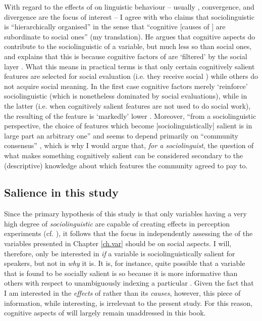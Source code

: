 With regard to the effects of  on linguistic behaviour -- usually , convergence, and divergence are the focus of interest -- I agree with \textcite[17]{auer2014} who claims that sociolinguistic  is ``hierarchically organised'' in the sense that ``cognitive [causes of ] are subordinate to social ones'' (my translation).
He argues that cognitive aspects do contribute to the sociolinguistic  of a variable, but much less so than social ones, and explains that this is because cognitive factors of  are `filtered' by the social layer \parencite[cf.][18]{auer2014}.
What this means in practical terms is that only certain cognitively salient features are selected for social evaluation (i.e. they receive social ) while others do not acquire social meaning.
In the first case cognitive factors merely `reinforce' sociolinguistic  (which is nonetheless dominated by social evaluations), while in the latter (i.e. when cognitively salient features are not used to do social work), the resulting  of the feature is `markedly' lower \parencite[cf.][18]{auer2014}.
Moreover, \enquote{from a sociolinguistic perspective, the choice of features which become [sociolinguistically] salient is in large part an arbitrary one} and seems to depend primarily on \enquote{community consensus} \parencite[56]{llamasetal2017}, which is why I would argue that, \emph{for a sociolinguist}, the question of what makes something cognitively salient can be considered secondary to the (descriptive) knowledge about which features the community agreed to pay  to.

		\subsection{Salience in this study}
		\label{sec.sal.sal.study}

Since the primary hypothesis of this study is that only variables having a very high degree of \emph{sociolinguistic}  are capable of creating  effects in perception experiments (cf. ), it follows that the focus in independently assessing the  of the variables presented in Chapter \ref{ch.var} should be on social aspects.
I will, therefore, only be interested in \emph{if} a variable is sociolinguistically salient for speakers, but not in \emph{why} it is.
It is, for instance, quite possible that a variable that is found to be socially salient is so because it is more informative than others with respect to unambiguously indexing a particular .
Given the fact that I am interested in the \emph{effects} of  rather than its \emph{causes}, however, this piece of information, while interesting, is irrelevant to the present study.
For this reason, cognitive aspects of  will largely remain unaddressed in this book.

